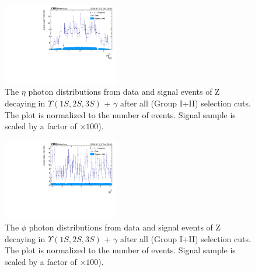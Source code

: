 \begin{figure}[!htbp]
\begin{center}
\includegraphics[width=0.45\textwidth]{figures/outputPlots/ZtoUpsilon_Cat0_ZZZZZ/nEvts/data_x_mc/withKinCuts/h_withKin_Photon_eta}\hspace*{1.cm}
\end{center}\vspace*{-.5cm}
\caption{The $\eta$ photon distributions from data and signal events of Z decaying in $\Upsilon(1S,2S,3S)$ + $\gamma$ after all (Group I+II) selection cuts. The plot is normalized to the number of events. Signal sample is scaled by a factor of $\times 100$).}
\label{fig:etaPhoton_ZtoUpsilon_Cat0_groupI_plus_II}
\end{figure}

\begin{figure}[!htbp]
\begin{center}
\includegraphics[width=0.45\textwidth]{figures/outputPlots/ZtoUpsilon_Cat0_ZZZZZ/nEvts/data_x_mc/withKinCuts/h_withKin_Photon_phi}\hspace*{1.cm}
\end{center}\vspace*{-.5cm}
\caption{The $\phi$ photon distributions from data and signal events of Z decaying in $\Upsilon(1S,2S,3S)$ + $\gamma$ after all (Group I+II) selection cuts. The plot is normalized to the number of events. Signal sample is scaled by a factor of $\times 100$).}
\label{fig:phiPhoton_ZtoUpsilon_Cat0_groupI_plus_II}
\end{figure}

